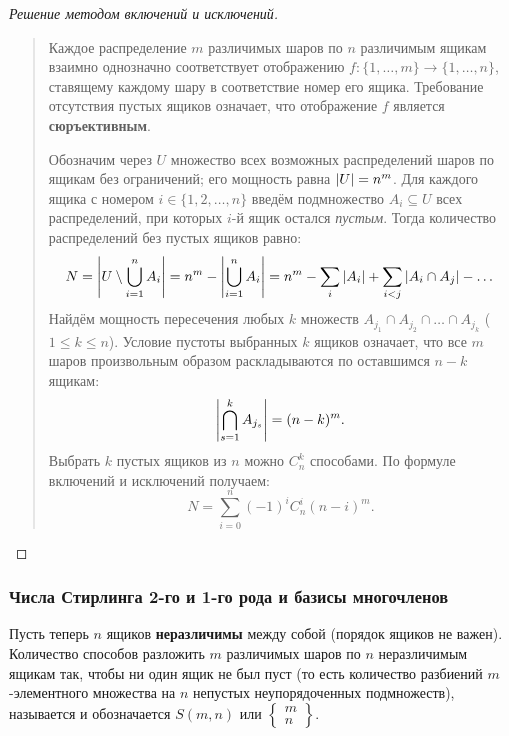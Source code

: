 \begin{proof}[Решение методом включений и исключений]~\\
    \begin{quote}
        Каждое распределение $m$ различимых шаров по $n$ различимым ящикам 
        взаимно однозначно соответствует отображению $f: \{1, \dots, m\} \to 
        \{1, \dots, n\}$, ставящему каждому шару в соответствие номер его 
        ящика. Требование отсутствия пустых ящиков означает, что отображение 
        $f$ является \textbf{сюръективным}.

        Обозначим через $U$ множество всех возможных распределений шаров 
        по ящикам без ограничений; его мощность равна $\left| U \right| = n^m$. 
        Для каждого ящика с номером $i \in \{1, 2, \dots, n\}$ введём 
        подмножество $A_i \subseteq U$ всех распределений, при которых 
        $i$-й ящик остался \emph{пустым}. Тогда количество распределений 
        без пустых ящиков равно:
        \[
            N = \left| U \setminus \bigcup_{i=1}^{n} A_i \right| = 
            n^m - \left| \bigcup_{i=1}^{n} A_i \right| = 
            n^m - \sum_{i} \left| A_i \right| + \sum_{i < j} \left| A_i \cap A_j \right| - \dots
        \]
        Найдём мощность пересечения любых $k$ множеств 
        $A_{j_1} \cap A_{j_2} \cap \dots \cap A_{j_k}$ ($1 \le k \le n$). 
        Условие пустоты выбранных $k$ ящиков означает, что все $m$ шаров 
        произвольным образом раскладываются по оставшимся $n - k$ ящикам:
        \[
            \left| \bigcap_{s=1}^{k} A_{j_s} \right| = (n - k)^m.
        \]
        Выбрать $k$ пустых ящиков из $n$ можно $C_n^k$ способами. По 
        формуле включений и исключений получаем:
        \begin{equation} \label{eq:surj_pie}
            N = \sum_{i=0}^{n} (-1)^i C_n^i (n - i)^m. \tag{1}
        \end{equation}
    \end{quote}
\end{proof}

\subsubsection{Числа Стирлинга 2-го и 1-го рода и базисы многочленов}

\begin{definition}
    Пусть теперь $n$ ящиков \textbf{неразличимы} между собой (порядок 
    ящиков не важен). Количество способов разложить $m$ различимых шаров по 
    $n$ неразличимым ящикам так, чтобы ни один ящик не был пуст (то есть 
    количество разбиений $m$-элементного множества на $n$ непустых 
    неупорядоченных подмножеств), называется  и обозначается $S(m, n)$ или $\left\{ \begin{matrix} m \\ n 
    \end{matrix} \right\}$.
\end{definition}

